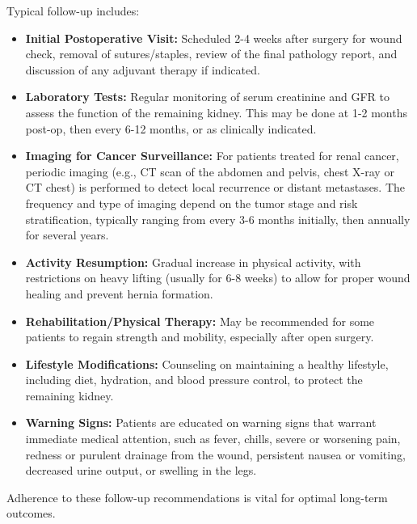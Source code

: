 Typical follow-up includes:
\begin{itemize}
  \item \textbf{Initial Postoperative Visit:} Scheduled 2-4 weeks after surgery for wound check, removal of sutures/staples, review of the final pathology report, and discussion of any adjuvant therapy if indicated.
  \item \textbf{Laboratory Tests:} Regular monitoring of serum creatinine and GFR to assess the function of the remaining kidney. This may be done at 1-2 months post-op, then every 6-12 months, or as clinically indicated.
  \item \textbf{Imaging for Cancer Surveillance:} For patients treated for renal cancer, periodic imaging (e.g., CT scan of the abdomen and pelvis, chest X-ray or CT chest) is performed to detect local recurrence or distant metastases. The frequency and type of imaging depend on the tumor stage and risk stratification, typically ranging from every 3-6 months initially, then annually for several years.
  \item \textbf{Activity Resumption:} Gradual increase in physical activity, with restrictions on heavy lifting (usually for 6-8 weeks) to allow for proper wound healing and prevent hernia formation.
  \item \textbf{Rehabilitation/Physical Therapy:} May be recommended for some patients to regain strength and mobility, especially after open surgery.
  \item \textbf{Lifestyle Modifications:} Counseling on maintaining a healthy lifestyle, including diet, hydration, and blood pressure control, to protect the remaining kidney.
  \item \textbf{Warning Signs:} Patients are educated on warning signs that warrant immediate medical attention, such as fever, chills, severe or worsening pain, redness or purulent drainage from the wound, persistent nausea or vomiting, decreased urine output, or swelling in the legs.
\end{itemize}
Adherence to these follow-up recommendations is vital for optimal long-term outcomes.

